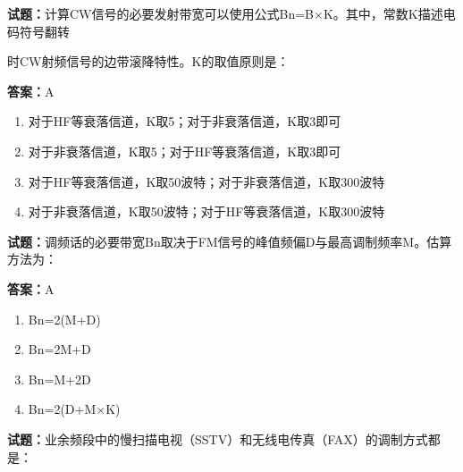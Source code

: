 \documentclass{ctexbook}
\begin{document}




\vspace{1em}

\textbf{试题：}计算CW信号的必要发射带宽可以使用公式Bn=B×K。其中，常数K描述电码符号翻转


时CW射频信号的边带滚降特性。K的取值原则是： 

\textbf{答案：}A 

\begin{enumerate}[leftmargin=3em]
  \item 对于HF等衰落信道，K取5；对于非衰落信道，K取3即可 

  \item 对于非衰落信道，K取5；对于HF等衰落信道，K取3即可 

  \item 对于HF等衰落信道，K取50波特；对于非衰落信道，K取300波特 

  \item 对于非衰落信道，K取50波特；对于HF等衰落信道，K取300波特 

\end{enumerate}





\vspace{1em}

\textbf{试题：}调频话的必要带宽Bn取决于FM信号的峰值频偏D与最高调制频率M。估算方法为： 

\textbf{答案：}A 

\begin{enumerate}[leftmargin=3em]
  \item Bn=2(M+D) 

  \item Bn=2M+D 

  \item Bn=M+2D 

  \item Bn=2(D+M×K) 

\end{enumerate}





\vspace{1em}

\textbf{试题：}业余频段中的慢扫描电视（SSTV）和无线电传真（FAX）的调制方式都是： 
\end{document}
